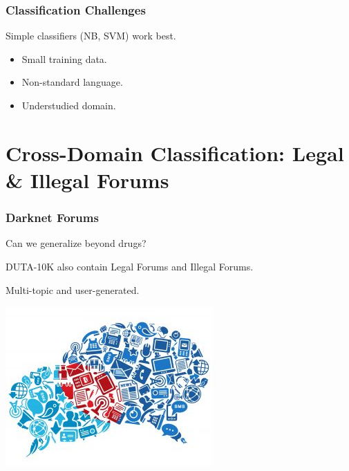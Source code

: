 \documentclass[t,xcolor={svgnames,table}]{beamer}
\begin{document}
\begin{frame}
	\frametitle{Classification Challenges}
	
	Simple classifiers (NB, SVM) work best.
	\begin{itemize}\setlength\itemsep{1em}
	\item Small training data.
	\item Non-standard language.
	\item Understudied domain.
	\end{itemize}
\end{frame}

\section{Cross-Domain Classification: Legal \& Illegal Forums}

\begin{frame}
	\frametitle{Darknet Forums}
	
	Can we generalize beyond drugs?
	\vfill
	\pause
	
	DUTA-10K also contain
	{\color{green}Legal Forums} and {\color{red}Illegal Forums}.
	
	Multi-topic and user-generated.
	\vfill
	
	\begin{center}
	\includegraphics[width=.5\textwidth]{forum.jpg}
	\end{center}
\end{frame}
\end{document}
